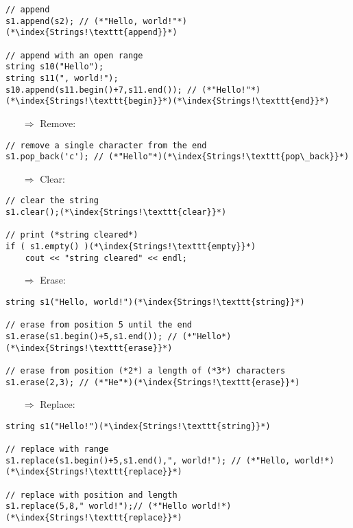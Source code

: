 \documentclass[10pt]{article}
\begin{document}
\begin{lstlisting}
// append
s1.append(s2); // (*"Hello, world!"*)(*\index{Strings!\texttt{append}}*)

// append with an open range
string s10("Hello");
string s11(", world!");
s10.append(s11.begin()+7,s11.end()); // (*"Hello!"*)(*\index{Strings!\texttt{begin}}*)(*\index{Strings!\texttt{end}}*)
\end{lstlisting}
\begin{enumerate}
\item[$\Rightarrow$] Remove:
\end{enumerate}
\begin{lstlisting}
// remove a single character from the end
s1.pop_back('c'); // (*"Hello"*)(*\index{Strings!\texttt{pop\_back}}*)
\end{lstlisting}
\begin{enumerate}
\item[$\Rightarrow$] Clear:
\end{enumerate}
\begin{lstlisting}
// clear the string
s1.clear();(*\index{Strings!\texttt{clear}}*)

// print (*string cleared*)
if ( s1.empty() )(*\index{Strings!\texttt{empty}}*)
    cout << "string cleared" << endl;
\end{lstlisting}
\begin{enumerate}
\item[$\Rightarrow$] Erase:
\end{enumerate}
\begin{lstlisting}
string s1("Hello, world!")(*\index{Strings!\texttt{string}}*)

// erase from position 5 until the end
s1.erase(s1.begin()+5,s1.end()); // (*"Hello*)(*\index{Strings!\texttt{erase}}*)

// erase from position (*2*) a length of (*3*) characters
s1.erase(2,3); // (*"He"*)(*\index{Strings!\texttt{erase}}*)
\end{lstlisting}
\begin{enumerate}
\item[$\Rightarrow$] Replace:
\end{enumerate}
\begin{lstlisting}
string s1("Hello!")(*\index{Strings!\texttt{string}}*)

// replace with range
s1.replace(s1.begin()+5,s1.end(),", world!"); // (*"Hello, world!*)(*\index{Strings!\texttt{replace}}*)

// replace with position and length
s1.replace(5,8," world!");// (*"Hello world!*)(*\index{Strings!\texttt{replace}}*)
\end{lstlisting}
\end{document}
